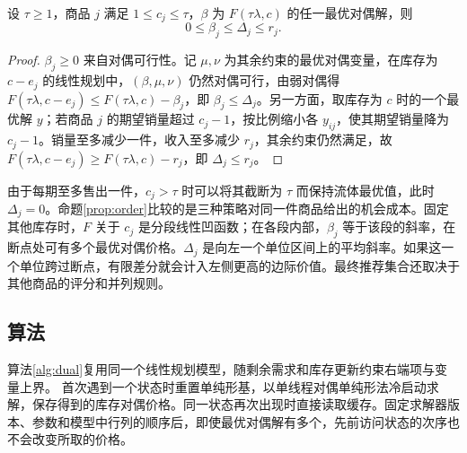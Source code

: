 \begin{proposition}\label{prop:order}
设 $\tau\ge1$，商品 $j$ 满足 $1\le c_j\le\tau$，$\beta$ 为 $F(\tau\lambda,c)$ 的任一最优对偶解，则
\begin{equation}
0\le\beta_j\le\Delta_j\le r_j.
\label{eq:order}
\end{equation}
\end{proposition}
\begin{proof}
$\beta_j\ge0$ 来自对偶可行性。记 $\mu,\nu$ 为其余约束的最优对偶变量，在库存为 $c-e_j$ 的线性规划中，$(\beta,\mu,\nu)$ 仍然对偶可行，由弱对偶得 $F(\tau\lambda,c-e_j)\le F(\tau\lambda,c)-\beta_j$，即 $\beta_j\le\Delta_j$。另一方面，取库存为 $c$ 时的一个最优解 $y$；若商品 $j$ 的期望销量超过 $c_j-1$，按比例缩小各 $y_{ij}$，使其期望销量降为 $c_j-1$。销量至多减少一件，收入至多减少 $r_j$，其余约束仍然满足，故 $F(\tau\lambda,c-e_j)\ge F(\tau\lambda,c)-r_j$，即 $\Delta_j\le r_j$。
\end{proof}

由于每期至多售出一件，$c_j>\tau$ 时可以将其截断为 $\tau$ 而保持流体最优值，此时 $\Delta_j=0$。命题\ref{prop:order}比较的是三种策略对同一件商品给出的机会成本。固定其他库存时，$F$ 关于 $c_j$ 是分段线性凹函数；在各段内部，$\beta_j$ 等于该段的斜率，在断点处可有多个最优对偶价格。$\Delta_j$ 是向左一个单位区间上的平均斜率。如果这一个单位跨过断点，有限差分就会计入左侧更高的边际价值。最终推荐集合还取决于其他商品的评分和并列规则。

\subsection{算法}
算法\ref{alg:dual}复用同一个线性规划模型，随剩余需求和库存更新约束右端项与变量上界。\LPDual{} 首次遇到一个状态时重置单纯形基，以单线程对偶单纯形法冷启动求解，保存得到的库存对偶价格。同一状态再次出现时直接读取缓存。固定求解器版本、参数和模型中行列的顺序后，即使最优对偶解有多个，先前访问状态的次序也不会改变所取的价格。

